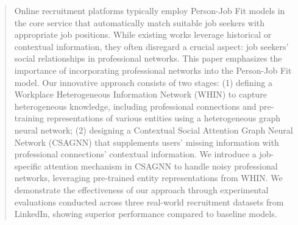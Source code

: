 \begin{abstract}
Online recruitment platforms typically employ Person-Job Fit models in the core service that automatically match suitable job seekers with appropriate job positions. While existing works leverage historical or contextual information, they often disregard a crucial aspect: job seekers' social relationships in professional networks. This paper emphasizes the importance of incorporating professional networks into the Person-Job Fit model. Our innovative approach consists of two stages: (1) defining a Workplace Heterogeneous Information Network (WHIN) to capture heterogeneous knowledge, including professional connections and pre-training representations of various entities using a heterogeneous graph neural network; (2) designing a Contextual Social Attention Graph Neural Network (CSAGNN) that supplements users' missing information with professional connections' contextual information. We introduce a job-specific attention mechanism in CSAGNN to handle noisy professional networks, leveraging pre-trained entity representations from WHIN. We demonstrate the effectiveness of our approach through experimental evaluations conducted across three real-world recruitment datasets from LinkedIn, showing superior performance compared to baseline models.
\end{abstract}